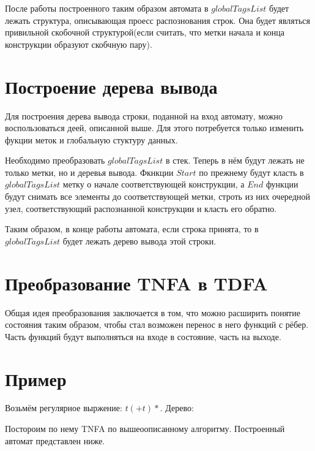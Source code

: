 \documentclass{article}
\begin{document}
\clearpage

После работы построенного таким образом автомата в $globalTagsList$ будет лежать структура, описывающая проесс распознования строк. Она будет являться привильной скобочной структурой(если считать, что метки начала и конца конструкции образуют скобчную пару). 


\section{Построение дерева вывода}

Для построения дерева вывода строки, поданной на вход автомату, можно воспользоваться деей, описанной выше. Для этого потребуется только изменить фукции меток и глобальную стуктуру данных. 

Необходимо преобразовать $globalTagsList$ в стек. Теперь в нём будут лежать не только метки, но и деревья вывода. Фкнкции $Start$ по прежнему будут класть в $globalTagsList$ метку о начале соответствующей конструкции, а $End$ функции будут снимать все элементы до соответствующей метки, строть из них очередной узел, соответствующий распознанной конструкции и класть его обратно.

Таким образом, в конце работы автомата, если строка принята, то в $globalTagsList$ будет лежать дерево вывода этой строки.

\section{Преобразование TNFA в TDFA}

Общая идея преобразования заключается в том, что можно расширить понятие состояния таким образом, чтобы стал возможен перенос в него функций с рёбер. Часть функций будут выполняться на входе в состояние, часть на выходе. 



\section{Пример}
  Возьмём регулярное выржение: $t(+t)*$. 
  Дерево:
  \begin{flushleft}
        
  \end{flushleft}

\clearpage

  Постороим по нему TNFA по вышеоописанному алгоритму. Построенный автомат представлен ниже.

  \begin{flushleft}
        
  \end{flushleft}
\end{document}
